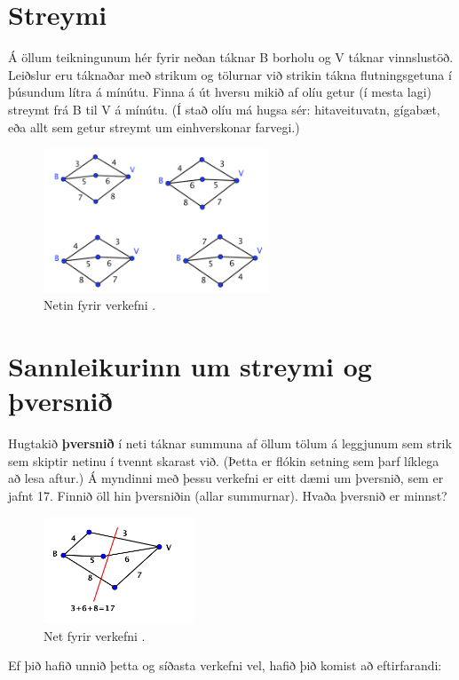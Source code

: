 \documentclass[b5paper,12pt]{book}
\renewcommand*\thesection{\arabic{section}}
\begin{document}
\section{Streymi}
\label{sec:streymi}
Á öllum teikningunum hér fyrir neðan táknar B borholu og V táknar vinnslustöð. Leiðslur eru táknaðar með strikum og tölurnar við strikin tákna flutningsgetuna í þúsundum lítra á mínútu. Finna á út hversu mikið af olíu getur (í mesta lagi) streymt frá B til V á mínútu. (Í stað olíu má hugsa sér: hitaveituvatn, gígabæt, eða allt sem getur streymt um einhverskonar farvegi.)
\begin{figure}[h]
  \includegraphics[width=0.6\textwidth, center]{Flaedi1.png}
  \caption*{Netin fyrir verkefni \thesection{}.}
\end{figure}

\section{Sannleikurinn um streymi og þversnið}
Hugtakið \textbf{þversnið} í neti táknar summuna af öllum tölum á leggjunum sem strik sem skiptir netinu í tvennt skarast við. (Þetta er flókin setning sem þarf líklega að lesa aftur.) Á myndinni með þessu verkefni er eitt dæmi um þversnið, sem er jafnt 17. Finnið öll hin þversniðin (allar summurnar). Hvaða þversnið er minnst? 
\begin{figure}[h]
  \includegraphics[width=0.4\textwidth, center]{Thversnid.png}
  \caption*{Net fyrir verkefni \thesection{}.}
\end{figure}

Ef þið hafið unnið þetta og síðasta verkefni vel, hafið þið komist að eftirfarandi:\\
\end{document}
